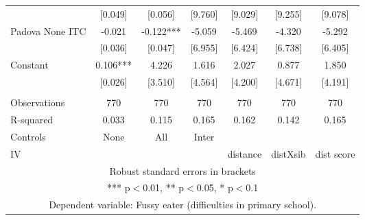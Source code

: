 \begin{tabular}{lcccccc}
 & [0.049] & [0.056] & [9.760] & [9.029] & [9.255] & [9.078] \\
Padova None ITC & -0.021 & -0.122*** & -5.059 & -5.469 & -4.320 & -5.292 \\
 & [0.036] & [0.047] & [6.955] & [6.424] & [6.738] & [6.405] \\
Constant & 0.106*** & 4.226 & 1.616 & 2.027 & 0.877 & 1.850 \\
 & [0.026] & [3.510] & [4.564] & [4.200] & [4.671] & [4.191] \\
 &  &  &  &  &  &  \\
Observations & 770 & 770 & 770 & 770 & 770 & 770 \\
R-squared & 0.033 & 0.115 & 0.165 & 0.162 & 0.142 & 0.165 \\
Controls & None & All & Inter &  &  &  \\
 IV &  &  &  & distance & distXsib & dist score \\ \hline
\multicolumn{7}{c}{ Robust standard errors in brackets} \\
\multicolumn{7}{c}{ *** p$<$0.01, ** p$<$0.05, * p$<$0.1} \\
\multicolumn{7}{c}{ Dependent variable: Fussy eater (difficulties in primary school).} \\
\end{tabular}
